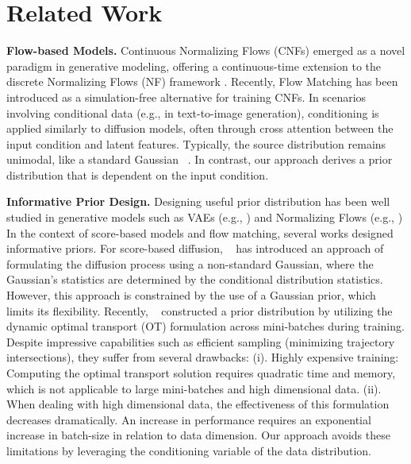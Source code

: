 \section{Related Work}


\noindent \textbf{Flow-based Models.} \quad
Continuous Normalizing Flows (CNFs) \citep{chen2019neural} emerged as a novel paradigm in generative modeling, offering a continuous-time extension to the discrete Normalizing Flows (NF) framework \citep{kobyzev2020normalizing, papamakarios2021normalizing}. 
Recently, Flow Matching \citep{lipman2022flow, liu2022flow, albergo2022building} has been introduced as a simulation-free alternative for training CNFs.
In scenarios involving conditional data (e.g., in text-to-image generation), conditioning is applied similarly to diffusion models, often through cross attention between the input condition and latent features. Typically, the source distribution remains unimodal, like a standard Gaussian ~\citep{liu2024generative}. In contrast, our approach derives a prior distribution that is dependent on the input condition.





\noindent \textbf{Informative Prior Design.} \quad
Designing useful prior distribution has been well studied in generative models such as VAEs (e.g., \cite{dilokthanakul2016deep}) and Normalizing Flows (e.g., \cite{izmailov2020semi})
In the context of score-based models and flow matching, several works designed informative priors. 
For score-based diffusion, ~\cite{lee2021priorgrad} has introduced an approach of formulating the diffusion process using a non-standard Gaussian, where the Gaussian's statistics are determined by the conditional distribution statistics. 
However, this approach is constrained by the use of a Gaussian prior, which limits its flexibility.
Recently, ~\cite{pooladian2023multisample, tong2023improving} constructed a prior distribution by utilizing the dynamic optimal transport (OT) formulation across mini-batches during training. Despite impressive capabilities such as efficient sampling (minimizing trajectory intersections), they suffer from several drawbacks: (i). Highly expensive training: Computing the optimal transport solution requires quadratic time and memory, which is not applicable to large mini-batches and high dimensional data. (ii). When dealing with high dimensional data, the effectiveness of this formulation decreases dramatically. An increase in performance requires an exponential increase in batch-size in relation to data dimension. 
Our approach avoids these limitations by leveraging the conditioning variable of the data distribution. 

